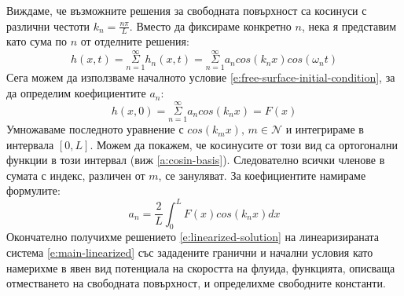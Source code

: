 \documentclass[12pt]{article}
\numberwithin{equation}{section}
\begin{document}
Виждаме, че възможните решения за свободната повърхност са косинуси с различни честоти $k_n = \frac{n \pi}{L}$. Вместо да фиксираме конкретно $n$, нека я представим като сума по $n$ от отделните решения:
\begin{equation}
    h(x,t) = \overset{\infty}{\underset{n=1}{\Sigma}} h_n(x,t)
    = \overset{\infty}{\underset{n=1}{\Sigma}} a_n cos(k_n x)cos(\omega_n t)
\end{equation}
Сега можем да използваме началното условие \autoref{e:free-surface-initial-condition}, за да определим коефициентите $a_n$:
\begin{equation}
    h(x,0) = \overset{\infty}{\underset{n=1}{\Sigma}} a_n cos(k_n x)
    = F(x)
\end{equation}
Умножаваме последното уравнение с $cos(k_m x), \, m \in \mathcal{N}$ и интегрираме в интервала $[0,L]$. Можем да покажем, че косинусите от този вид са ортогонални функции в този интервал (виж \autoref{a:cosin-basis}). Следователно всички членове в сумата с индекс, различен от $m$, се зануляват. За коефициентите намираме формулите:
\begin{equation}
    a_n = \frac{2}{L}\int_0^L F(x) cos(k_n x) dx
\end{equation}
Окончателно получихме решението \autoref{e:linearized-solution} на линеаризираната система \autoref{e:main-linearized} със зададените гранични и начални условия като намерихме в явен вид потенциала на скоростта на флуида, функцията, описваща отместването на свободната повърхност, и определихме свободните константи.
\end{document}
